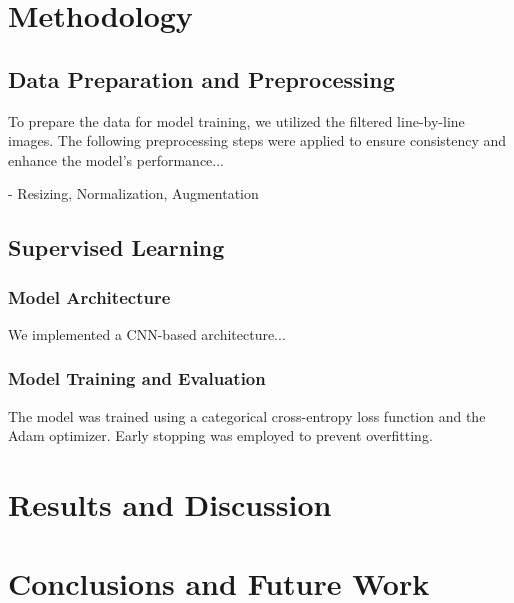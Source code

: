\documentclass[conference]{IEEEtran}
\begin{document}
\section{Methodology}



\subsection{Data Preparation and Preprocessing}
To prepare the data for model training, we utilized the filtered line-by-line images. The following preprocessing steps were applied to ensure consistency and enhance the model’s performance...


- Resizing, Normalization, Augmentation

\subsection{Supervised Learning}

\subsubsection{Model Architecture}

We implemented a CNN-based architecture...

\subsubsection{Model Training and Evaluation}

The model was trained using a categorical cross-entropy loss function and the Adam optimizer. Early stopping was employed to prevent overfitting.













\section{Results and Discussion}

\blindtext[2]

\section{Conclusions and Future Work}

\blindtext[3]




 

\end{document}
